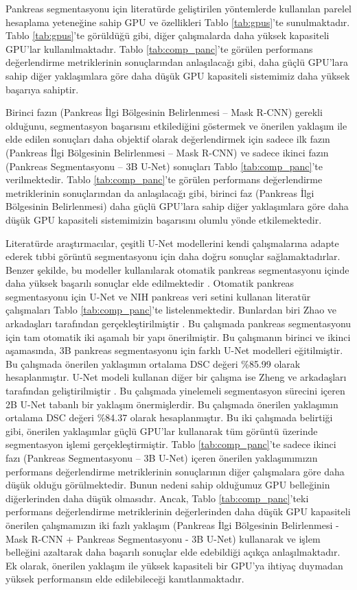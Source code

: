 Pankreas segmentasyonu için literatürde geliştirilen yöntemlerde kullanılan parelel hesaplama yeteneğine sahip GPU ve özellikleri Tablo \ref{tab:gpus}'te sunulmaktadır. Tablo \ref{tab:gpus}'te görüldüğü gibi, diğer çalışmalarda daha yüksek kapasiteli GPU'lar kullanılmaktadır. Tablo \ref{tab:comp_panc}’te görülen performans değerlendirme metriklerinin sonuçlarından anlaşılacağı gibi, daha güçlü GPU'lara sahip diğer yaklaşımlara göre daha düşük GPU kapasiteli sistemimiz daha yüksek başarıya sahiptir.  

Birinci fazın (Pankreas İlgi Bölgesinin Belirlenmesi – Mask R-CNN) gerekli olduğunu, segmentasyon başarısını etkilediğini göstermek ve önerilen yaklaşım ile elde edilen sonuçları daha objektif olarak değerlendirmek için sadece ilk fazın (Pankreas İlgi Bölgesinin Belirlenmesi – Mask R-CNN) ve sadece ikinci fazın (Pankreas Segmentasyonu – 3B U-Net) sonuçları Tablo \ref{tab:comp_panc}'te verilmektedir. Tablo \ref{tab:comp_panc}’te görülen performans değerlendirme metriklerinin sonuçlarından da anlaşılacağı gibi, birinci faz (Pankreas İlgi Bölgesinin Belirlenmesi) daha güçlü GPU'lara sahip diğer yaklaşımlara göre daha düşük GPU kapasiteli sistemimizin başarısını olumlu yönde etkilemektedir.

Literatürde araştırmacılar, çeşitli U-Net modellerini kendi çalışmalarına adapte ederek tıbbi görüntü segmentasyonu için daha doğru sonuçlar sağlamaktadırlar. Benzer şekilde, bu modeller kullanılarak otomatik pankreas segmentasyonu içinde daha yüksek başarılı sonuçlar elde edilmektedir \cite{zhao2019fully,zheng2020deep}. Otomatik pankreas segmentasyonu için U-Net ve NIH pankreas veri setini kullanan literatür çalışmaları Tablo \ref{tab:comp_panc}'te listelenmektedir. Bunlardan biri Zhao ve arkadaşları tarafından gerçekleştirilmiştir \cite{zhao2019fully}. Bu çalışmada pankreas segmentasyonu için tam otomatik iki aşamalı bir yapı önerilmiştir. Bu çalışmanın birinci ve ikinci aşamasında, 3B pankreas segmentasyonu için farklı U-Net modelleri eğitilmiştir. Bu çalışmada önerilen yaklaşımın ortalama DSC değeri \%85.99 olarak hesaplanmıştır. U-Net modeli kullanan diğer bir çalışma ise Zheng ve arkadaşları tarafından geliştirilmiştir \cite{zheng2020deep}. Bu çalışmada yinelemeli segmentasyon sürecini içeren 2B U-Net tabanlı bir yaklaşım önermişlerdir. Bu çalışmada önerilen yaklaşımın ortalama DSC değeri \%84.37 olarak hesaplanmıştır. Bu iki çalışmada belirtiği gibi, önerilen yaklaşımlar güçlü GPU’lar kullanarak tüm görüntü üzerinde segmentasyon işlemi gerçekleştirmiştir. Tablo \ref{tab:comp_panc}'te sadece ikinci fazı (Pankreas Segmentasyonu – 3B U-Net) içeren önerilen yaklaşımımızın  performans değerlendirme metriklerinin sonuçlarının diğer çalışmalara göre daha düşük olduğu görülmektedir. Bunun nedeni sahip olduğumuz GPU belleğinin diğerlerinden daha düşük olmasıdır. Ancak, Tablo \ref{tab:comp_panc}’teki performans değerlendirme metriklerinin değerlerinden daha düşük GPU kapasiteli önerilen çalışmamızın iki fazlı yaklaşım (Pankreas İlgi Bölgesinin Belirlenmesi - Mask R-CNN + Pankreas Segmentasyonu  - 3B U-Net) kullanarak ve işlem belleğini azaltarak daha başarılı sonuçlar elde edebildiği açıkça anlaşılmaktadır. Ek olarak, önerilen yaklaşım ile yüksek kapasiteli bir GPU'ya ihtiyaç duymadan yüksek performansın elde edilebileceği kanıtlanmaktadır.

